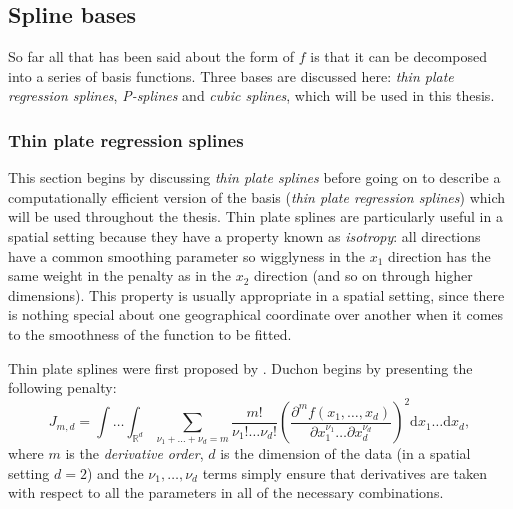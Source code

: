 \subsection{Spline bases}

So far all that has been said about the form of $f$ is that it can be decomposed into a series of basis functions. Three bases are discussed here: \textit{thin plate regression splines}, \textit{P-splines} and \textit{cubic splines}, which will be used in this thesis.

\subsubsection{Thin plate regression splines}
\label{GAMtprs}
\label{GAMtprspenalty}
\label{cor-tprs}

This section begins by discussing \textit{thin plate splines} before going on to describe a computationally efficient version of the basis (\textit{thin plate regression splines}) which will be used throughout the thesis. Thin plate splines are particularly useful in a spatial setting because they have a property known as \textit{isotropy}: all directions have a common smoothing parameter so wigglyness in the $x_1$ direction has the same weight in the penalty as in the $x_2$ direction (and so on through higher dimensions). This property is usually appropriate in a spatial setting, since there is nothing special about one geographical coordinate over another when it comes to the smoothness of the function to be fitted.

Thin plate splines were first proposed by . Duchon begins by presenting the following penalty:
\begin{equation}
J_{m,d} = \int \ldots \int_{\mathbb{R}^d} \sum_{\nu_1 + \dots + \nu_d=m} \frac{m!}{\nu_1! \dots \nu_d!} \left ( \frac{\partial^m f(x_1,\dots,x_d)}{\partial x_1^{\nu_1} \ldots  \partial x_d^{\nu_d}} \right )^2 \text{d} x_1 \ldots  \text{d} x_d,
\label{tprs-pen}
\end{equation}
where $m$ is the \textit{derivative order}, $d$ is the dimension of the data (in a spatial setting $d=2$) and the $\nu_1,\ldots,\nu_d$ terms simply ensure that derivatives are taken with respect to all the parameters in all of the necessary combinations.

